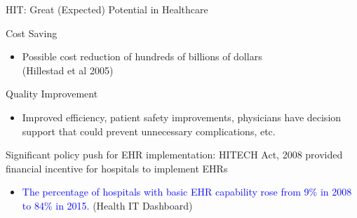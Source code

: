 \documentclass[10pt]{beamer}
\begin{document}
\begin{frame}[fragile]{HIT: Great (Expected) Potential in Healthcare}
\begin{alertblock}{Cost Saving}
\begin{itemize}
    \item Possible cost reduction of hundreds of billions of dollars \\ \scriptsize (Hillestad et al 2005)
\end{itemize}
\end{alertblock}

\begin{alertblock}{Quality Improvement}
\begin{itemize}
    \item Improved efficiency, patient safety improvements, physicians have decision support that could prevent unnecessary complications, etc.
\end{itemize}
\end{alertblock}

\vspace{4mm}

Significant policy push for EHR implementation: HITECH Act, 2008 provided financial incentive for hospitals to implement EHRs
\begin{itemize}
    \item \textcolor{blue}{The percentage of hospitals with basic EHR capability rose from 9$\%$ in 2008 to 84$\%$ in 2015.} \scriptsize (Health IT Dashboard)
\end{itemize}

\end{frame}
\end{document}
